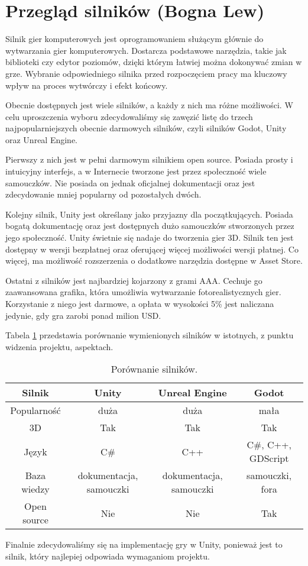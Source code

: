 \section{Przegląd silników (Bogna Lew)}\label{s:silniki}
Silnik gier komputerowych jest oprogramowaniem służącym głównie do wytwarzania gier komputerowych. Dostarcza podstawowe
narzędzia, takie jak biblioteki czy edytor poziomów, dzięki którym łatwiej można dokonywać zmian w grze. Wybranie
odpowiedniego silnika przed rozpoczęciem pracy ma kluczowy wpływ na proces wytwórczy i efekt końcowy.

Obecnie dostępnych jest wiele silników, a każdy z nich ma różne możliwości. W celu uproszczenia wyboru zdecydowaliśmy
się zawęzić listę do trzech najpopularniejszych obecnie darmowych silników, czyli silników Godot, Unity oraz Unreal Engine.

Pierwszy z nich jest w pełni darmowym silnikiem open source. Posiada prosty i intuicyjny interfejs, a w Internecie
tworzone jest przez społeczność wiele samouczków. Nie posiada on jednak oficjalnej dokumentacji oraz jest zdecydowanie
mniej popularny od pozostałych dwóch.

Kolejny silnik, Unity jest określany jako przyjazny dla początkujących. Posiada bogatą dokumentację oraz jest dostępnych
dużo samouczków stworzonych przez jego społeczność. Unity świetnie się nadaje do tworzenia gier 3D. Silnik ten jest
dostępny w wersji bezpłatnej oraz oferującej więcej możliwości wersji płatnej. Co więcej, ma możliwość rozszerzenia
o dodatkowe narzędzia dostępne w Asset Store.

Ostatni z silników jest najbardziej kojarzony z grami AAA. Cechuje go zaawansowana grafika, która umożliwia wytwarzanie
fotorealistycznych gier. Korzystanie z niego jest darmowe, a opłata w wysokości 5\% jest naliczana jedynie, gdy gra
zarobi ponad milion USD.

Tabela \ref{fig:teng} przedstawia porównanie wymienionych silników w istotnych, z punktu widzenia projektu, aspektach.

\begin{table}[h]
\caption{Porównanie silników.}
\begin{center}
\begin{tabular}{ |c||c|c|c| }
 \hline
 Silnik & Unity & Unreal Engine & Godot \\
 \hline \hline
 Popularność & duża & duża & mała \\
 \hline
 3D & Tak & Tak & Tak \\
 \hline
 Język & C\# & C++ & C\#, C++, GDScript \\
 \hline
 Baza wiedzy & dokumentacja, samouczki & dokumentacja, samouczki & samouczki, fora \\
 \hline
 Open source & Nie & Nie & Tak \\
 \hline
\end{tabular}
\end{center}
\label{fig:teng} 
\end{table}

Finalnie zdecydowaliśmy się na implementację gry w Unity, ponieważ jest to silnik, który najlepiej odpowiada wymaganiom projektu.
